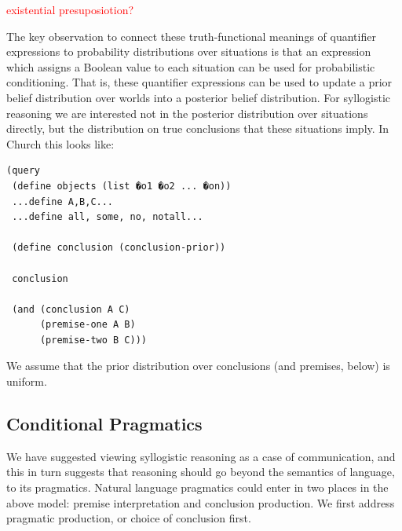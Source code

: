 \documentclass[10pt,letterpaper]{article}
\newcommand{\red}[1]{\textcolor{Red}{#1}}
\begin{document}
\red{existential presuposiotion?}

The key observation to connect these truth-functional meanings of quantifier expressions to probability distributions over situations is that an expression which assigns a Boolean value to each situation can be used for probabilistic conditioning. That is, these quantifier expressions can be used to update a prior belief distribution over worlds into a posterior belief distribution. For syllogistic reasoning we are interested not in the posterior distribution over situations directly, but the distribution on true conclusions that these situations imply. In Church this looks like:
\begin{lstlisting}
(query
 (define objects (list �o1 �o2 ... �on)) 
 ...define A,B,C...
 ...define all, some, no, notall...
 
 (define conclusion (conclusion-prior))
 
 conclusion
 
 (and (conclusion A C) 
      (premise-one A B)
      (premise-two B C)))
\end{lstlisting}
We assume that the prior distribution over conclusions (and premises, below) is uniform.

%
%  
%  


\subsection{Conditional Pragmatics}
We have suggested viewing syllogistic reasoning as a case of communication, and this in turn suggests that reasoning should go beyond the semantics of language, to its pragmatics.
Natural language pragmatics could enter in two places in the above model: premise interpretation and conclusion production. 
We first address pragmatic production, or choice of conclusion first.
\end{document}
